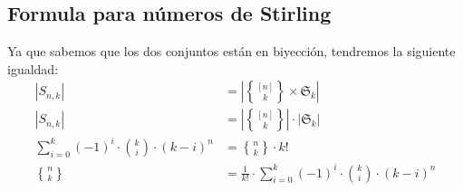 \documentclass[12pt,a4paper,oneside]{memoir}
\DeclareRobustCommand{\stirling}{\genfrac\{\}{0pt}{}}
\begin{document}
\subsection*{Formula para números de Stirling}
Ya que sabemos que los dos conjuntos están en biyección, tendremos la siguiente igualdad:
\begin{align*}
    |S_{n, k}| &= \left|\stirling{[n]}{k} \times \mathfrak{S}_k\right|\\
    |S_{n, k}| &= \left|\stirling{[n]}{k}\right| \cdot |\mathfrak{S}_k|\\
    \sum_{i = 0}^k (-1)^i \cdot \binom{k}{i} \cdot (k-i)^n &= \stirling{n}{k} \cdot k!\\
    \stirling{n}{k} &= \frac{1}{k!} \cdot \sum_{i = 0}^k (-1)^i \cdot \binom{k}{i} \cdot (k-i)^n\\
\end{align*}
\end{document}
